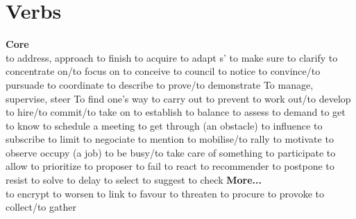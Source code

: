 \section{Verbs}
{\sffamily\bfseries Core}\\
   {to address, approach}
   {to finish}
   {to acquire}
   {to adapt}
 {s'}   {to make sure}
   {to clarify}
   {to concentrate on/to focus on}
   {to conceive}
   {to council}
   {to notice}
   {to convince/to pursuade}
   {to coordinate}
   {to describe}
   {to prove/to demonstrate}
   {To manage, supervise, steer}
   {To find one's way}
   {to carry out}
   {to prevent}
   {to work out/to develop}
   {to hire/to commit/to take on}
   {to establish}
   {to balance}
   {to assess}
   {to demand}
   {to get to know}
   {to schedule a meeting}
   {to get through (an obstacle)}
   {to influence}
   {to subscribe}
   {to limit}
   {to negociate}
   {to mention}
   {to mobilise/to rally}
   {to motivate}
   {to observe}
   {occupy (a job)}
   {to be busy/to take care of something}
   {to participate}
   {to allow}
   {to prioritize}
   {to proposer}
   {to fail}
   {to react}
   {to recommender}
   {to postpone}
   {to resist}
   {to solve}
   {to delay}
   {to select}
   {to suggest}
   {to check}
\newline
{\sffamily\bfseries More...}\\
   {to encrypt}
   {to worsen}
   {to link}
   {to favour}
   {to threaten}
   {to procure}
   {to provoke}
   {to collect/to gather}
